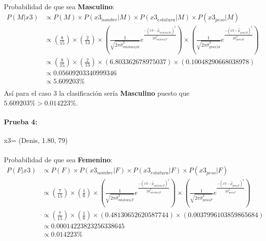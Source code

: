 \documentclass[12pt]{article}
\begin{document}
\paragraph{}Probabilidad de que sea \textbf{Masculino}:\\
\begin{equation}
\begin{split}
P(M|x3) &\propto P(M) \times P(x3_{nombre}|M) \times P(x3_{estatura}|M) \times P(x3_{peso}|M) \\
&\propto (\frac{8}{15}) \times (\frac{2}{13}) \times (\frac{1}{\sqrt{2\pi\hat{\sigma}_{\text{estatura}|M}^2}}e^{\frac{-(x3 - \hat{\mu}_{\text{estatura}|M})^2}{2\hat{\sigma}_{\text{estatura}|F}^2}}) \times (\frac{1}{\sqrt{2\pi\hat{\sigma}_{\text{peso}|M}^2}}e^{\frac{-(x3 - \hat{\mu}_{\text{peso}|M})^2}{2\hat{\sigma}_{\text{peso}|M}^2}}) \\
&\propto (\frac{8}{15}) \times (\frac{2}{13}) \times (6.803362678975037) \times (0.10048290668038978) \\
&\propto 0.05609203340999346 \\
&\propto 5.609203 \% \\
\end{split}
\end{equation}
Así para el caso 3 la clasificación sería \textbf{Masculino} puesto que $5.609203\% > 0.014223\%$.\\
\clearpage
\pagebreak
\paragraph{Prueba 4: }x3= (Denis, 1.80, 79)
\paragraph{}Probabilidad de que sea \textbf{Femenino}:\\
\begin{equation}
\begin{split}
P(F|x3) &\propto P(F) \times P(x3_{nombre}|F) \times P(x3_{estatura}|F) \times P(x3_{peso}|F) \\
&\propto (\frac{7}{15}) \times (\frac{1}{6}) \times (\frac{1}{\sqrt{2\pi\hat{\sigma}_{\text{estatura}|F}^2}}e^{\frac{-(x3 - \hat{\mu}_{\text{estatura}|F})^2}{2\hat{\sigma}_{\text{estatura}|F}^2}}) \times (\frac{1}{\sqrt{2\pi\hat{\sigma}_{\text{peso}|F}^2}}e^{\frac{-(x3 - \hat{\mu}_{\text{peso}|F})^2}{2\hat{\sigma}_{\text{peso}|F}^2}}) \\
&\propto (\frac{7}{15}) \times (\frac{1}{6}) \times (0.48130652620587744) \times (0.0037996103859865684) \\
&\propto 0.00014223823256338645 \\
&\propto 0.014223\% \\
\end{split}
\end{equation}
\end{document}
